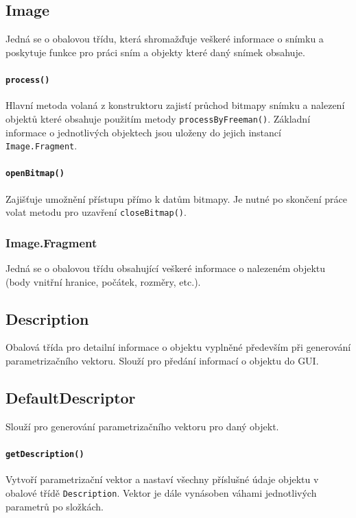 \documentclass[12pt]{article}
\begin{document}
\subsection{Image}
Jedná se o obalovou třídu, která shromažďuje veškeré informace o snímku a poskytuje funkce pro práci sním a objekty které daný snímek obsahuje.

\paragraph{\texttt{process()}}
Hlavní metoda volaná z konstruktoru zajistí průchod bitmapy snímku a nalezení objektů které obsahuje použitím metody \texttt{processByFreeman()}. Základní informace o jednotlivých objektech jsou uloženy do jejich instancí \texttt{Image.Fragment}.

\paragraph{\texttt{openBitmap()}}
Zajišťuje umožnění přístupu přímo k datům bitmapy. Je nutné po skončení práce volat metodu pro uzavření \texttt{closeBitmap()}.

\subsubsection{Image.Fragment}
Jedná se o obalovou třídu obsahující veškeré informace o nalezeném objektu (body vnitřní hranice, počátek, rozměry, etc.).

\subsection{Description}
Obalová třída pro detailní informace o objektu vyplněné především při generování parametrizačního vektoru. Slouží pro předání informací o objektu do GUI.

\subsection{DefaultDescriptor}
Slouží pro generování parametrizačního vektoru pro daný objekt. 

\paragraph{\texttt{getDescription()}}
Vytvoří parametrizační vektor a nastaví všechny příslušné údaje objektu v obalové třídě \texttt{Description}. Vektor je dále vynásoben váhami jednotlivých parametrů po složkách.
\end{document}
